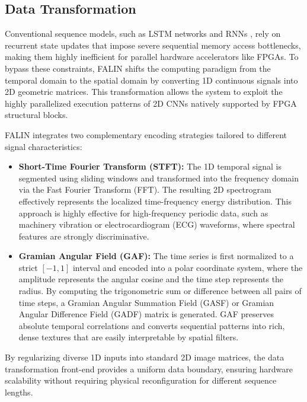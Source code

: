 \documentclass[10pt,conference]{IEEEtran}
\begin{document}
\subsection{Data Transformation}
\label{subsec:data_transformation}

Conventional sequence models, such as LSTM networks \cite{hochreiter1997long} and RNNs \cite{schmidt2019recurrent}, rely on recurrent state updates that impose severe sequential memory access bottlenecks, making them highly inefficient for parallel hardware accelerators like FPGAs. To bypass these constraints, FALIN shifts the computing paradigm from the temporal domain to the spatial domain by converting 1D continuous signals into 2D geometric matrices. This transformation allows the system to exploit the highly parallelized execution patterns of 2D CNNs natively supported by FPGA structural blocks.

FALIN integrates two complementary encoding strategies tailored to different signal characteristics:
\begin{itemize}
    \item \textbf{Short-Time Fourier Transform (STFT):} The 1D temporal signal is segmented using sliding windows and transformed into the frequency domain via the Fast Fourier Transform (FFT). The resulting 2D spectrogram effectively represents the localized time-frequency energy distribution. This approach is highly effective for high-frequency periodic data, such as machinery vibration or electrocardiogram (ECG) waveforms, where spectral features are strongly discriminative.
    \item \textbf{Gramian Angular Field (GAF):} The time series is first normalized to a strict $[-1, 1]$ interval and encoded into a polar coordinate system, where the amplitude represents the angular cosine and the time step represents the radius. By computing the trigonometric sum or difference between all pairs of time steps, a Gramian Angular Summation Field (GASF) or Gramian Angular Difference Field (GADF) matrix is generated. GAF preserves absolute temporal correlations and converts sequential patterns into rich, dense textures that are easily interpretable by spatial filters.
\end{itemize}

By regularizing diverse 1D inputs into standard 2D image matrices, the data transformation front-end provides a uniform data boundary, ensuring hardware scalability without requiring physical reconfiguration for different sequence lengths.
\end{document}
